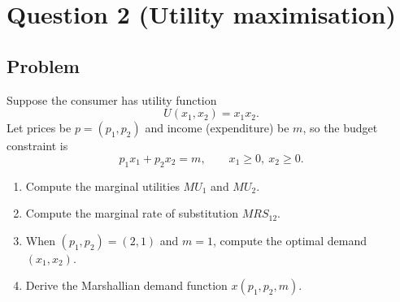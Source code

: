 \section*{Question 2 (Utility maximisation)}
\subsection*{Problem}
Suppose the consumer has utility function
\[
U(x_1,x_2)=x_1x_2.
\]
Let prices be $p=(p_1,p_2)$ and income (expenditure) be $m$, so the budget constraint is
\[
p_1x_1+p_2x_2=m,
\qquad x_1\ge 0,\ x_2\ge 0.
\]

\begin{enumerate}[label=(\alph*)]
  \item Compute the marginal utilities $MU_1$ and $MU_2$.
  \item Compute the marginal rate of substitution $MRS_{12}$.
  \item When $(p_1,p_2)=(2,1)$ and $m=1$, compute the optimal demand $(x_1,x_2)$.
  \item Derive the Marshallian demand function $x(p_1,p_2,m)$.
\end{enumerate}
